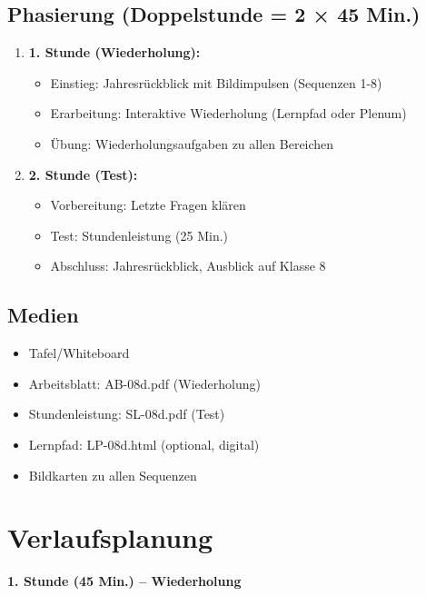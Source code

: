 \documentclass[11pt,a4paper]{article}
\begin{document}
\subsection{Phasierung (Doppelstunde = 2 × 45 Min.)}
\begin{enumerate}
    \item \textbf{1. Stunde (Wiederholung):}
    \begin{itemize}
        \item Einstieg: Jahresrückblick mit Bildimpulsen (Sequenzen 1-8)
        \item Erarbeitung: Interaktive Wiederholung (Lernpfad oder Plenum)
        \item Übung: Wiederholungsaufgaben zu allen Bereichen
    \end{itemize}
    \item \textbf{2. Stunde (Test):}
    \begin{itemize}
        \item Vorbereitung: Letzte Fragen klären
        \item Test: Stundenleistung (25 Min.)
        \item Abschluss: Jahresrückblick, Ausblick auf Klasse 8
    \end{itemize}
\end{enumerate}

\subsection{Medien}
\begin{itemize}
    \item Tafel/Whiteboard
    \item Arbeitsblatt: AB-08d.pdf (Wiederholung)
    \item Stundenleistung: SL-08d.pdf (Test)
    \item Lernpfad: LP-08d.html (optional, digital)
    \item Bildkarten zu allen Sequenzen
\end{itemize}

\section{Verlaufsplanung}

\textbf{1. Stunde (45 Min.) -- Wiederholung}
\end{document}
